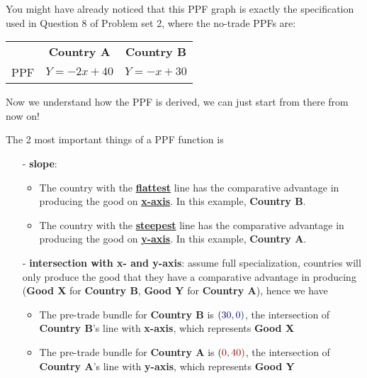 \documentclass[twoside]{article}
\theoremstyle{definition}
\begin{document}
You might have already noticed that this PPF graph is exactly the specification used in Question 8 of Problem set 2, where the no-trade PPFs are:

\begin{table}[h!]
    \centering
    \begin{tabular}{ccc}
       & \textbf{\color{red!55!black}Country A} & \textbf{\color{blue!45!black}Country B} \\
     PPF & {\color{red!55!black} $Y = -2x+40$} & {\color{blue!45!black} $Y= -x+30$}
    \end{tabular}
\end{table}

Now we understand how the PPF is derived, we can just start from there from now on!

The 2 most important things of a PPF function is
\begin{itemize}
    \item[-] \textbf{slope}: 
    \begin{itemize}
        \item The country with the \underline{\textbf{flattest}} line has the comparative advantage in producing the good on \underline{\textbf{x-axis}}. In this example, \textbf{\color{blue!45!black}Country B}.
        \item The country with the \underline{\textbf{steepest}} line has the comparative advantage in producing the good on \underline{\textbf{y-axis}}. In this example, \textbf{\color{red!55!black}Country A}.
    \end{itemize}
    
    
    \item[-] \textbf{intersection with x- and y-axis}: assume full specialization, countries will only produce the good that they have a comparative advantage in producing (\textbf{\color{blue!45!black}Good X} for \textbf{\color{blue!45!black}Country B}, \textbf{\color{red!55!black}Good Y} for \textbf{\color{red!55!black}Country A}), hence we have
    \begin{itemize}
        \item The pre-trade bundle for \textbf{\color{blue!45!black}Country B} is ${(\color{blue!45!black}30,0)}$, the intersection of \textbf{\color{blue!45!black}Country B}'s line with \textbf{x-axis}, which represents \textbf{\color{blue!45!black}Good X}
        \item The pre-trade bundle for \textbf{\color{red!55!black}Country A} is ${(\color{red!55!black}0,40)}$, the intersection of \textbf{\color{red!55!black}Country A}'s line with \textbf{y-axis}, which represents \textbf{\color{red!55!black}Good Y}
    \end{itemize}
\end{itemize}
\end{document}
